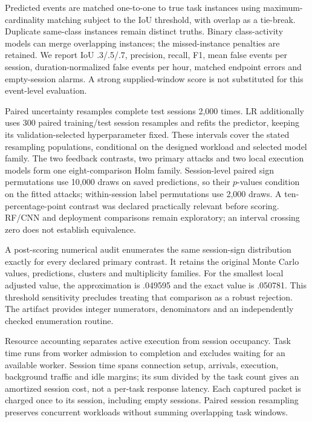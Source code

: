 Predicted events are matched one-to-one to true task instances using maximum-cardinality matching subject to the IoU threshold, with overlap as a tie-break. Duplicate same-class instances remain distinct truths. Binary class-activity models can merge overlapping instances; the missed-instance penalties are retained. We report IoU .3/.5/.7, precision, recall, F1, mean false events per session, duration-normalized false events per hour, matched endpoint errors and empty-session alarms. A strong supplied-window score is not substituted for this event-level evaluation.

Paired uncertainty resamples complete test sessions 2,000 times. LR additionally uses 300 paired training/test session resamples and refits the predictor, keeping its validation-selected hyperparameter fixed. These intervals cover the stated resampling populations, conditional on the designed workload and selected model family. The two feedback contrasts, two primary attacks and two local execution models form one eight-comparison Holm family. Session-level paired sign permutations use 10,000 draws on saved predictions, so their $p$-values condition on the fitted attacks; within-session label permutations use 2,000 draws. A ten-percentage-point contrast was declared practically relevant before scoring. RF/CNN and deployment comparisons remain exploratory; an interval crossing zero does not establish equivalence.

A post-scoring numerical audit enumerates the same session-sign distribution exactly for every declared primary contrast. It retains the original Monte Carlo values, predictions, clusters and multiplicity families. For the smallest local adjusted value, the approximation is .049595 and the exact value is .050781. This threshold sensitivity precludes treating that comparison as a robust rejection. The artifact provides integer numerators, denominators and an independently checked enumeration routine.

Resource accounting separates active execution from session occupancy. Task time runs from worker admission to completion and excludes waiting for an available worker. Session time spans connection setup, arrivals, execution, background traffic and idle margins; its sum divided by the task count gives an amortized session cost, not a per-task response latency. Each captured packet is charged once to its session, including empty sessions. Paired session resampling preserves concurrent workloads without summing overlapping task windows.

